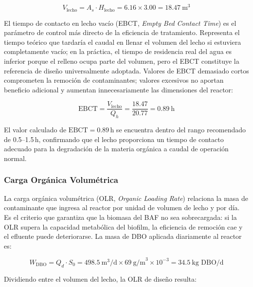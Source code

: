\documentclass[12pt,a4paper]{article}
\begin{document}
\begin{equation}
V_{\text{lecho}} = A_{s} \cdot H_{\text{lecho}} = 6.16 \times 3.00 = 18.47\ \text{m}^3
\end{equation}

El tiempo de contacto en lecho vacío (EBCT, \textit{Empty Bed Contact Time}) es el parámetro de control más directo de la eficiencia de tratamiento. Representa el tiempo teórico que tardaría el caudal en llenar el volumen del lecho si estuviera completamente vacío; en la práctica, el tiempo de residencia real del agua es inferior porque el relleno ocupa parte del volumen, pero el EBCT constituye la referencia de diseño universalmente adoptada. Valores de EBCT demasiado cortos comprometen la remoción de contaminantes; valores excesivos no aportan beneficio adicional y aumentan innecesariamente las dimensiones del reactor:

\begin{equation}
\text{EBCT} = \frac{V_{\text{lecho}}}{Q_{h}} = \frac{18.47}{20.77} = 0.89\ \text{h}
\end{equation}

El valor calculado de $\text{EBCT} = 0.89$\,h se encuentra dentro del rango recomendado de 0.5--1.5\,h, confirmando que el lecho proporciona un tiempo de contacto adecuado para la degradación de la materia orgánica a caudal de operación normal.

\subsubsection*{Carga Orgánica Volumétrica}

La carga orgánica volumétrica (OLR, \textit{Organic Loading Rate}) relaciona la masa de contaminante que ingresa al reactor por unidad de volumen de lecho y por día. Es el criterio que garantiza que la biomasa del BAF no sea sobrecargada: si la OLR supera la capacidad metabólica del biofilm, la eficiencia de remoción cae y el efluente puede deteriorarse. La masa de DBO aplicada diariamente al reactor es:

\begin{equation}
W_{\text{DBO}} = Q_{d} \cdot S_0 = 498.5\ \text{m}^3\text{/d} \times 69\ \text{g/m}^3 \times 10^{-3} = 34.5\ \text{kg DBO/d}
\end{equation}

Dividiendo entre el volumen del lecho, la OLR de diseño resulta:
\end{document}
